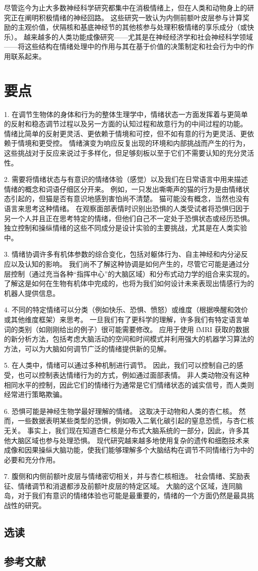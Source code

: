 尽管迄今为止大多数神经科学研究都集中在消极情绪上，但在人类和动物身上的研究正在阐明积极情绪的神经回路。 这些研究一致认为内侧前额叶皮层参与计算奖励的主观价值，伏隔核和基底神经节的其他核参与处理积极情绪的享乐成分（或快乐）。 越来越多的人类功能成像研究——尤其是在神经经济学和社会神经科学领域——将这些结构在情绪处理中的作用与其在基于价值的决策制定和社会行为中的作用联系起来。


\section{要点}
1. 在调节生物体的身体和行为的整体生理学中，情绪状态一方面发挥着与更简单的反射和稳态调节过程以及另一方面的认知过程和故意行为的中间过程的功能。 情绪比简单的反射更灵活、更依赖于情境和可控，但不如有意的行为更灵活、更依赖于情境和更受控。 情绪演变为响应反复出现的环境和内部挑战而产生的行为，这些挑战对于反应来说过于多样化，但足够刻板以至于它们不需要认知的充分灵活性。 

2. 需要将情绪状态与有意识的情绪体验（感觉）以及我们在日常语言中用来描述情绪的概念和词语仔细区分开来。 例如，一只发出嘶嘶声的猫的行为是由情绪状态引起的，但猫是否有意识地感到害怕尚不清楚。 猫可能没有概念，当然也没有语言来思考这种情绪。 在观察面部表情时识别出恐惧的人类受试者将恐惧归因于另一个人并且正在思考特定的情绪，但他们自己不一定处于恐惧状态或经历恐惧。 独立控制和操纵情绪的这些不同成分是设计实验的主要挑战，尤其是在人类实验中。 

3. 情绪协调许多有机体参数的综合变化，包括对躯体行为、自主神经和内分泌反应以及认知的影响。 我们尚不了解这种协调是如何产生的，尽管它可能是通过分层控制（通过充当各种“指挥中心”的大脑区域）和分布式动力学的组合来实现的。 了解这是如何在生物有机体中完成的，也将为我们如何设计未来表现出情感行为的机器人提供信息。 

4. 不同的特定情绪可以分类（例如快乐、恐惧、愤怒）或维度（根据唤醒和效价或其他维度框架）来思考。 一旦我们有了更科学的理解，许多我们有特定语言单词的类别（如刚刚给出的例子）很可能需要修改。 应用于使用 fMRI 获取的数据的新分析方法，包括考虑大脑活动的空间和时间模式并利用强大的机器学习算法的方法，可以为大脑如何调节广泛的情绪提供新的见解。 

5. 在人类中，情绪可以通过多种机制进行调节。 因此，我们可以控制自己的感受，也可以控制表达情绪行为的方式，例如通过面部表情。 非人类动物没有这种相同水平的控制，因此它们的情绪行为通常是它们情绪状态的诚实信号，而人类则经常进行策略欺骗。 

6. 恐惧可能是神经生物学最好理解的情绪。 这取决于动物和人类的杏仁核。 然而，一些数据表明某些类型的恐惧，例如吸入二氧化碳引起的窒息恐慌，与杏仁核无关。 事实上，我们现在知道杏仁核是分布式大脑系统的一部分，因此，许多其他大脑区域也参与处理恐惧。 现代研究越来越多地使用复杂的遗传和细胞技术来成像和因果操纵大脑功能，使我们能够理解多个大脑结构在调节不同情绪行为中的必要和充分作用。 

7. 腹侧和内侧前额叶皮层与情绪密切相关，并与杏仁核相连。 社会情绪、奖励表征、情绪调节和消退都涉及前额叶皮层的特定区域。 大脑的这个区域，连同脑岛，对于我们有意识的情绪体验也可能是最重要的，情绪的一个方面仍然是最具挑战性的研究。

\subsection{选读}
\subsection{参考文献}